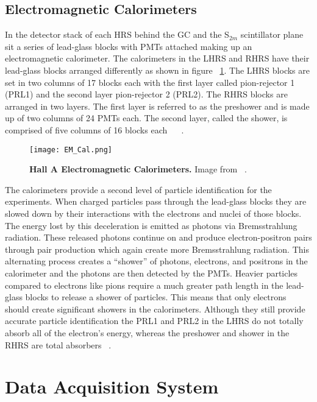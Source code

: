 \subsection{Electromagnetic Calorimeters}
\label{ssec:em_cal}

In the detector stack of each HRS behind the GC and the S$_{2m}$ scintillator plane sit a series of lead-glass blocks with PMTs attached making up an electromagnetic calorimeter. The calorimeters in the LHRS and RHRS have their lead-glass blocks arranged differently as shown in figure ~\ref{fig:em_cal}. The LHRS blocks are set in two columns of 17 blocks each with the first layer called pion-rejector 1 (PRL1) and the second layer pion-rejector 2 (PRL2). The RHRS blocks are arranged in two layers. The first layer is referred to as the preshower and is made up of two columns of 24 PMTs each. The second layer, called the shower, is comprised of five columns of 16 blocks each ~\cite{Thesis:Ye} ~\cite{Article:HallA}. 

\begin{figure}[!ht]
\begin{center}
\texttt{[image: EM\_Cal.png]}
\end{center}
\caption{
{\bf{Hall A Electromagnetic Calorimeters.}} Image from ~\cite{Article:HallA}.}
\label{fig:em_cal}
\end{figure}

The calorimeters provide a second level of particle identification for the experiments. When charged particles pass through the lead-glass blocks they are slowed down by their interactions with the electrons and nuclei of those blocks. The energy lost by this deceleration is emitted as photons via Bremsstrahlung radiation. These released photons continue on and produce electron-positron pairs through pair production which again create more Bremsstrahlung radiation. This alternating process creates a ``shower'' of photons, electrons, and positrons in the calorimeter and the photons are then detected by the PMTs. Heavier particles compared to electrons like pions require a much greater path length in the lead-glass blocks to release a shower of particles. This means that only electrons should create significant showers in the calorimeters. Although they still provide accurate particle identification the PRL1 and PRL2 in the LHRS do not totally absorb all of the electron's energy, whereas the preshower and shower in the RHRS are total absorbers ~\cite{Thesis:Ye}.

\section{Data Acquisition System}
\label{sec:daq}

